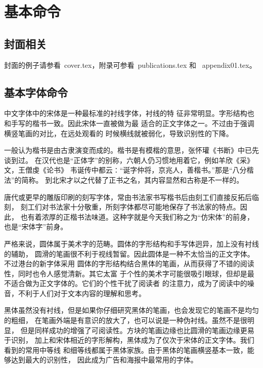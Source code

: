 

\chapter{基本命令}
\label{cha:command}


\section{封面相关}
\label{sec:cover}

封面的例子请参看~cover.tex，附录可参看~publications.tex 和
~appendix01.tex。

\section{基本字体命令}
\label{sec:font}

中文字体中的宋体是一种最标准的衬线字体，衬线的特
征非常明显。字形结构也和手写的楷书一致。因此宋体一直被做为最
适合的正文字体之一。不过由于强调横竖笔画的对比，在远处观看的
时候横线就被弱化，导致识别性的下降。

{\kai
一般认为楷书是由古隶演变而成的。楷书是有模楷的意思，张怀瓘《书断》中已先谈到过。
在汉代也是“正体字”的别称，六朝人仍习惯地用着它，例如羊欣《采》文，王僧虔《论书》
韦诞传中都云∶“诞字仲将，京兆人，善楷书。”那是“八分楷法”的简称。
到北宋才以之代替了正书之名，其内容显然和古称是不一样的。}

{\fs
唐代或更早的雕版印刷的刻写字体，常由书法家书写楷书后由刻工们直接反拓后临刻，
刻工们对书法家十分敬重，所刻字体都尽可能地保存了书法家的特点。因此，
也有着浓厚的正楷书法味道。这种字就是今天我们称之为“仿宋体”的前身，
也是“宋体字”前身。}

{\you
严格来说，圆体属于美术字的范畴。圆体的字形结构和手写体迥异，加上没有衬线的辅助，
圆滑的笔画很不利于视线暂留。因此圆体是一种不太恰当的正文字体。不过港台的新字体采用
圆体的字形结构结合黑体的笔画，从而获得了不错的阅读性，同时也令人感觉清新。其它太富
于个性的美术字可能很吸引眼球，但却是最不适合做为正文字体的。它们的个性干扰了阅读者
的注意力，成为了阅读中的噪音，不利于人们对于文本内容的理解和思考。}

{\hei
黑体虽然没有衬线，但是如果你仔细研究黑体的笔画，也会发现它的笔画不是均匀的粗细，
在笔画外端是有意识的放大了，也可以说是一种伪衬线。虽然不是很明显，
但是同样成功的增强了可阅读性。方块的笔画边缘也比圆滑的笔画边缘更易于识别，
加上和宋体相近的字形解构，黑体成为了仅次于宋体的正文字体。我们看到的常用中等线
和细等线都属于黑体家族。由于黑体的笔画横竖基本一致，能够达到最大的识别性，
因此成为广告和海报中最常用的字体。}

